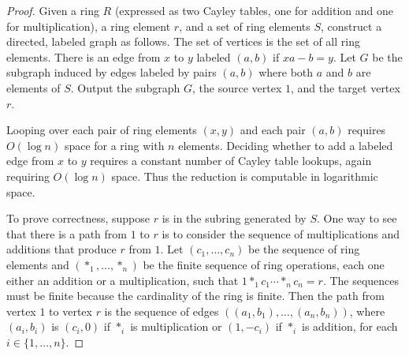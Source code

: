 \begin{proof}
  Given a ring $R$ (expressed as two Cayley tables, one for addition and one for multiplication), a ring element $r$, and a set of ring elements $S$, construct a directed, labeled graph as follows.
  The set of vertices is the set of all ring elements.
  There is an edge from $x$ to $y$ labeled $(a, b)$ if $x a - b = y$.
  Let $G$ be the subgraph induced by edges labeled by pairs $(a, b)$ where both $a$ and $b$ are elements of $S$.
  Output the subgraph $G$, the source vertex $1$, and the target vertex $r$.


  Looping over each pair of ring elements $(x, y)$ and each pair $(a, b)$ requires $O(\log n)$ space for a ring with $n$ elements.
  Deciding whether to add a labeled edge from $x$ to $y$ requires a constant number of Cayley table lookups, again requiring $O(\log n)$ space.
  Thus the reduction is computable in logarithmic space.

  To prove correctness, suppose $r$ is in the subring generated by $S$.
  One way to see that there is a path from $1$ to $r$ is to consider the sequence of multiplications and additions that produce $r$ from $1$.
  Let $(c_1, \dotsc, c_n)$ be the sequence of ring elements and $(\ast_1, \dotsc, \ast_n)$ be the finite sequence of ring operations, each one either an addition or a multiplication, such that $1 \ast_1 c_1 \dotsb \ast_n c_n = r$.
  The sequences must be finite because the cardinality of the ring is finite.
  Then the path from vertex $1$ to vertex $r$ is the sequence of edges $((a_1, b_1), \dotsc, (a_n, b_n))$, where $(a_i, b_i)$ is $(c_i, 0)$ if $\ast_i$ is multiplication or $(1, -c_i)$ if $\ast_i$ is addition, for each $i \in \{1, \dotsc, n\}$.


\end{proof}
